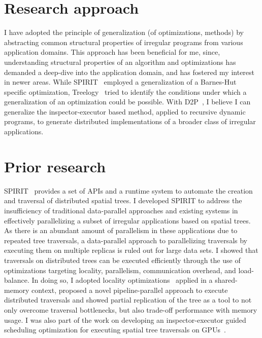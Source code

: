 \section*{Research approach} I have adopted the principle of generalization (of optimizations, methods) by abstracting common structural properties of irregular programs from various application domains. 
This approach has been beneficial for me, since, understanding structural properties of an algorithm and optimizations has demanded a deep-dive into the application domain, and has fostered my interest in newer areas. 
While SPIRIT~\cite{hegde17ics} employed a generalization of a Barnes-Hut specific optimization, Treelogy~\cite{hegde17ispass} tried to identify the conditions under which a generalization of an optimization could be possible.
With D2P~\cite{hegde19d2p}, I believe I can generalize the inspector-executor based method, applied to recursive dynamic programs, to generate distributed implementations of a broader class of irregular applications.  
    
\section*{Prior research}
SPIRIT~\cite{hegde17ics} provides a set of APIs and a runtime system to automate the creation and traversal of distributed spatial trees.
I developed SPIRIT to address the insufficiency of traditional data-parallel approaches and existing systems in effectively parallelizing a subset of irregular applications based on spatial trees.
As there is an abundant amount of parallelism in these applications due to repeated tree traversals, a data-parallel approach to parallelizing traversals by executing them on multiple replicas is ruled out for large data sets.
I showed that traversals on distributed trees can be executed efficiently through the use of optimizations targeting locality, parallelism, communication overhead, and load-balance.  
In doing so, I adopted locality optimizations~\cite{jo12oopsla, blocking} applied in a shared-memory context, proposed a novel pipeline-parallel approach to execute distributed traversals and showed partial replication of the tree as a tool to not only overcome traversal bottlenecks, but also trade-off performance with memory usage.
I was also part of the work on developing an inspector-executor guided scheduling optimization for executing spatial tree traversals on GPUs~\cite{ics16liu}.

